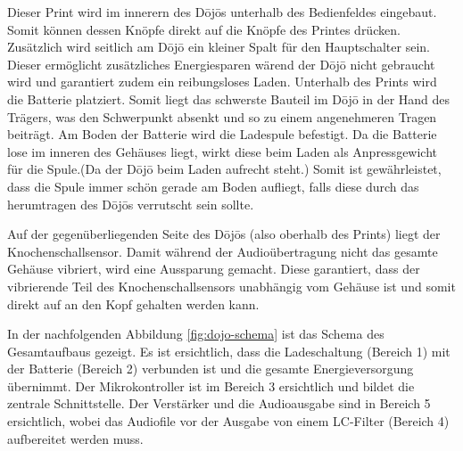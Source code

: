Dieser Print wird im innerern des Dōjōs unterhalb des Bedienfeldes eingebaut. Somit können dessen Knöpfe direkt auf die Knöpfe des Printes drücken. Zusätzlich wird seitlich am Dōjō ein kleiner Spalt für den Hauptschalter sein. Dieser ermöglicht zusätzliches Energiesparen wärend der Dōjō nicht gebraucht wird und garantiert zudem ein reibungsloses Laden. Unterhalb des Prints wird die Batterie platziert. Somit liegt das schwerste Bauteil im Dōjō in der Hand des Trägers, was den Schwerpunkt absenkt und so zu einem angenehmeren Tragen beiträgt. Am Boden der Batterie wird die Ladespule befestigt. Da die Batterie lose im inneren des Gehäuses liegt, wirkt diese beim Laden als Anpressgewicht für die Spule.(Da der Dōjō beim Laden aufrecht steht.) Somit ist gewährleistet, dass die Spule immer schön gerade am Boden aufliegt, falls diese durch das herumtragen des Dōjōs verrutscht sein sollte. 
 
Auf der gegenüberliegenden Seite des Dōjōs (also oberhalb des Prints) liegt der Knochenschallsensor. Damit während der Audioübertragung nicht das gesamte Gehäuse vibriert, wird eine Aussparung gemacht. Diese garantiert, dass der vibrierende Teil des Knochenschallsensors unabhängig vom Gehäuse ist und somit direkt auf an den Kopf gehalten werden kann.
 
In der nachfolgenden Abbildung \ref{fig:dojo-schema} ist das Schema des Gesamtaufbaus gezeigt. Es ist ersichtlich, dass die Ladeschaltung (Bereich 1) mit der Batterie (Bereich 2) verbunden ist und die gesamte Energieversorgung übernimmt. Der Mikrokontroller ist im Bereich 3 ersichtlich und bildet die zentrale Schnittstelle. Der Verstärker und die Audioausgabe sind in Bereich 5 ersichtlich, wobei das Audiofile vor der Ausgabe von einem LC-Filter (Bereich 4) aufbereitet werden muss.
\newpage 


